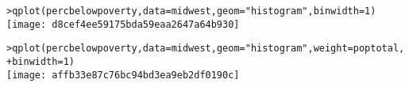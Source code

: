 \begin{alltt}
> qplot(percbelowpoverty, data = midwest, geom = "histogram", binwidth = 1)
\texttt{[image: d8cef4ee59175bda59eaa2647a64b930]}

> qplot(percbelowpoverty, data = midwest, geom = "histogram", weight = poptotal, 
+     binwidth = 1)
\texttt{[image: affb33e87c76bc94bd3ea9eb2df0190c]}

\end{alltt}


